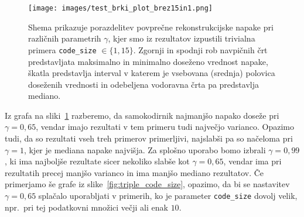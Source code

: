 \documentclass[12pt,a4paper,twoside]{article}
\theoremstyle{definition} %
\theoremstyle{plain} %
\numberwithin{equation}{section}  %
\begin{document}
\begin{figure}[h]
	\centering
	\texttt{[image: images/test\_brki\_plot\_brez15in1.png]}
	\caption[Graf z brki.]{Shema prikazuje porazdelitev povprečne rekonstrukcijske napake pri različnih parametrih $\gamma$,
	kjer smo iz rezultatov izpustili trivialna primera \texttt{code\_size} $\in \{1,15\}$.
	Zgornji in spodnji rob navpičnih črt predstavljata maksimalno in minimalno doseženo vrednost napake,
	škatla predstavlja interval v katerem je vsebovana (srednja) polovica doseženih vrednosti
	in odebeljena vodoravna črta pa predstavlja mediano.}
	\label{fig:boxplot}
\end{figure}

Iz grafa na sliki~\ref{fig:boxplot} razberemo, da samokodirnik najmanjšo napako doseže pri $\gamma=0,65$, vendar imajo rezultati v tem primeru tudi največjo varianco.
Opazimo tudi, da so rezultati vseh treh primerov primerljivi, najslabši pa so načeloma pri $\gamma=1$, kjer je mediana napake najvišja.
Za splošno uporabo bomo izbrali $\gamma=0,99$, ki ima najboljše rezultate sicer nekoliko slabše kot $\gamma=0,65$, 
vendar ima pri rezultatih precej manjšo varianco in ima manjšo mediano rezultatov.
Če primerjamo še grafe iz slike~\ref{fig:triple_code_size}, opazimo, da bi se nastavitev $\gamma=0,65$ splačalo uporabljati v primerih, 
ko je parameter \texttt{code\_size} dovolj velik, npr.\ pri tej podatkovni množici večji ali enak $10$.

\end{document}
